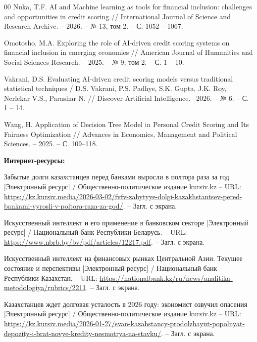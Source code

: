 \begin{thebibliography}{00}
	 Nuka, T.F. AI and Machine learning as tools for financial inclusion: challenges and opportunities in credit scoring // International Journal of Science and Research Archive. -- 2026. -- № 13, том 2. -- С. 1052 -- 1067.
	
	 Omotosho, M.A. Exploring the role of AI-driven credit scoring systems on financial inclusion in emerging economies // American Journal of Humanities and Social Sciences Research. -- 2025. -- № 9, том 2. -- С. 1 -- 10.
	
	 Vakrani, D.S. Evaluating AI-driven credit scoring models versus traditional statistical techniques / D.S. Vakrani, P.S. Padhye, S.K. Gupta, J.K. Roy, Nerlekar V.S., Parashar N. // Discover Artificial Intelligence. --2026. -- № 6. -- С. 1 -- 14.
	
	
	 Wang, H. Application of Decision Tree Model in Personal Credit Scoring and Its Fairness Optimization // Advances in Economics, Management and Political Sciences. -- 2025. -- С. 109--118.
	
	
	\makeatletter
	\renewcommand\@biblabel[1]{#1}
	\makeatother
	\bibitem[]{} \textbf{{\large Интернет-ресурсы:}}
	\makeatletter
	\renewcommand\@biblabel[1]{#1.}
	\makeatother
	
	
	Забытые долги казахстанцев перед банками выросли в полтора раза за год [Электронный ресурс] / Общественно-политическое издание kursiv.kz -- URL: \url{https://kz.kursiv.media/2026-03-02/fvfv-zabytyye-dolgi-kazakhstantsev-pered-bankami-vyrosli-v-poltora-raza-za-god/}. -- Загл. с экрана.
	
	 Искусственный интеллект и его применение в банковском секторе [Электронный ресурс] / Национальный банк Республики Беларусь. -- URL: \url{https://www.nbrb.by/bv/pdf/articles/12217.pdf}. -- Загл. с экрана.
	
	 Искусственный интеллект на финансовых рынках Центральной Азии. Текущее состояние и перспективы [Электронный ресурс] / Национальный банк Республики Казахстан. -- URL: \url{https://nationalbank.kz/ru/news/analitika-metodologiya/rubrics/2211}. -- Загл. с экрана.
	
	 Казахстанцев ждет долговая усталость в 2026 году: экономист озвучил опасения [Электронный ресурс] / Общественно-политическое издание kursiv.kz -- URL: \url{https://kz.kursiv.media/2026-01-27/svan-kazahstancy-prodolzhayut-popolnyat-depozity-i-brat-novye-kredity-nesmotrya-na-stavku/}. -- Загл. с экрана.
	

\end{thebibliography}
